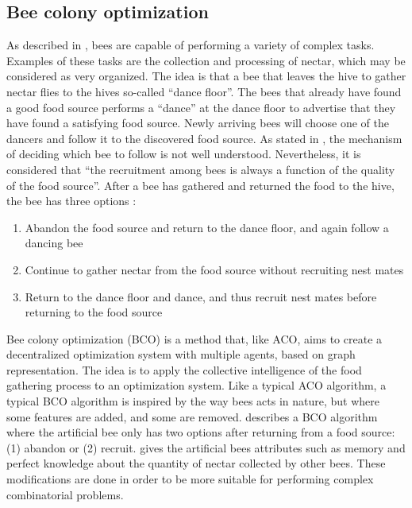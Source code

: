 \subsection{Bee colony optimization}
\label{subsec:BCO}
As described in \citet{lucic03}, bees are capable of performing a variety of complex tasks. Examples of these tasks are the collection and processing of nectar, which may be considered as very organized. The idea is that a bee that leaves the hive to gather nectar flies to the hives so-called ``dance floor''. The bees that already have found a good food source performs a ``dance'' at the dance floor to advertise that they have found a satisfying food source. Newly arriving bees will choose one of the dancers and follow it to the discovered food source. As stated in \citet{lucic03}, the mechanism of deciding which bee to follow is not well understood.  Nevertheless, it is considered that ``the recruitment among bees is always a function of the quality of the food source''. After a bee has gathered and returned the food to the hive, the bee has three options \citep{lucic03}:

\begin{enumerate}
  \item Abandon the food source and return to the dance floor, and again follow a dancing bee
  \item Continue to gather nectar from the food source without recruiting nest mates
  \item Return to the dance floor and dance, and thus recruit nest mates before returning to the food source
\end{enumerate}

Bee colony optimization (BCO) is a method that, like ACO, aims to create a decentralized optimization system with multiple agents, based on graph representation. The idea is to apply the collective intelligence of the food gathering process to an optimization system. Like a typical ACO algorithm, a typical BCO algorithm is inspired by the way bees acts in nature, but where some features are added, and some are removed. \citet{nikolic14} describes a BCO algorithm where the artificial bee only has two options after returning from a food source: (1) abandon or (2) recruit. \citet{lucic03} gives the artificial bees attributes such as memory and perfect knowledge about the quantity of nectar collected by other bees. These modifications are done in order to be more suitable for performing complex combinatorial problems.

